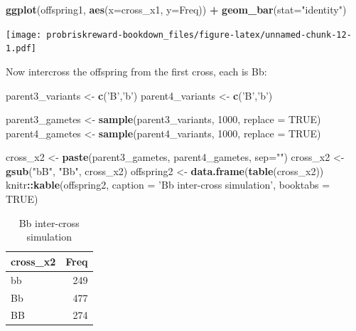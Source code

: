 \documentclass[]{book}
\newenvironment{Shaded}{\begin{snugshade}}{\end{snugshade}}
\newcommand{\KeywordTok}[1]{\textcolor[rgb]{0.13,0.29,0.53}{\textbf{#1}}}
\newcommand{\DataTypeTok}[1]{\textcolor[rgb]{0.13,0.29,0.53}{#1}}
\newcommand{\DecValTok}[1]{\textcolor[rgb]{0.00,0.00,0.81}{#1}}
\newcommand{\StringTok}[1]{\textcolor[rgb]{0.31,0.60,0.02}{#1}}
\newcommand{\OtherTok}[1]{\textcolor[rgb]{0.56,0.35,0.01}{#1}}
\newcommand{\OperatorTok}[1]{\textcolor[rgb]{0.81,0.36,0.00}{\textbf{#1}}}
\newcommand{\NormalTok}[1]{#1}
\theoremstyle{definition}
\theoremstyle{definition}
\theoremstyle{definition}
\theoremstyle{remark}
\begin{document}
\begin{Shaded}
\begin{Highlighting}[]
\KeywordTok{ggplot}\NormalTok{(offspring1, }\KeywordTok{aes}\NormalTok{(}\DataTypeTok{x=}\NormalTok{cross_x1, }\DataTypeTok{y=}\NormalTok{Freq)) }\OperatorTok{+}\StringTok{ }\KeywordTok{geom_bar}\NormalTok{(}\DataTypeTok{stat=}\StringTok{"identity"}\NormalTok{)}
\end{Highlighting}
\end{Shaded}

\texttt{[image: probriskreward-bookdown\_files/figure-latex/unnamed-chunk-12-1.pdf]}

Now intercross the offspring from the first cross, each is Bb:

\begin{Shaded}
\begin{Highlighting}[]
\NormalTok{parent3_variants <-}\StringTok{ }\KeywordTok{c}\NormalTok{(}\StringTok{'B'}\NormalTok{,}\StringTok{'b'}\NormalTok{)}
\NormalTok{parent4_variants <-}\StringTok{ }\KeywordTok{c}\NormalTok{(}\StringTok{'B'}\NormalTok{,}\StringTok{'b'}\NormalTok{)}

\NormalTok{parent3_gametes <-}\StringTok{ }\KeywordTok{sample}\NormalTok{(parent3_variants, }\DecValTok{1000}\NormalTok{, }\DataTypeTok{replace =} \OtherTok{TRUE}\NormalTok{)}
\NormalTok{parent4_gametes <-}\StringTok{ }\KeywordTok{sample}\NormalTok{(parent4_variants, }\DecValTok{1000}\NormalTok{, }\DataTypeTok{replace =} \OtherTok{TRUE}\NormalTok{)}

\NormalTok{cross_x2 <-}\StringTok{ }\KeywordTok{paste}\NormalTok{(parent3_gametes, parent4_gametes, }\DataTypeTok{sep=}\StringTok{""}\NormalTok{)}
\NormalTok{cross_x2 <-}\StringTok{ }\KeywordTok{gsub}\NormalTok{(}\StringTok{"bB"}\NormalTok{, }\StringTok{"Bb"}\NormalTok{, cross_x2)}
\NormalTok{offspring2 <-}\StringTok{ }\KeywordTok{data.frame}\NormalTok{(}\KeywordTok{table}\NormalTok{(cross_x2))}
\NormalTok{knitr}\OperatorTok{::}\KeywordTok{kable}\NormalTok{(offspring2, }\DataTypeTok{caption =} \StringTok{'Bb inter-cross simulation'}\NormalTok{, }\DataTypeTok{booktabs =} \OtherTok{TRUE}\NormalTok{)}
\end{Highlighting}
\end{Shaded}

\begin{table}

\caption{\label{tab:unnamed-chunk-13}Bb inter-cross simulation}
\centering
\begin{tabular}[t]{lr}
\toprule
cross\_x2 & Freq\\
\midrule
bb & 249\\
Bb & 477\\
BB & 274\\
\bottomrule
\end{tabular}
\end{table}
\end{document}

